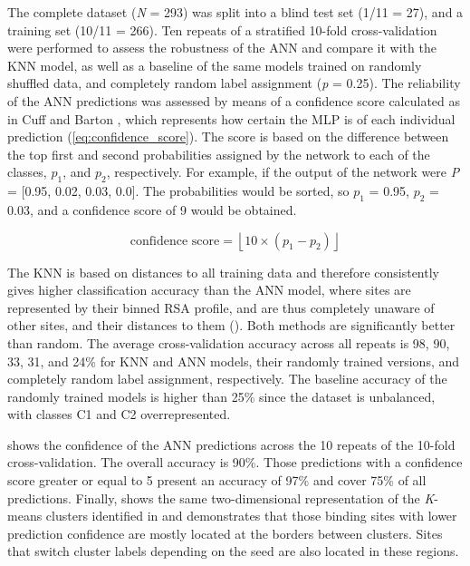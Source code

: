 {The complete dataset (\textit{N} = 293) was split into a blind test set (1/11 = 27), and a training set (10/11 = 266). Ten repeats of a stratified 10-fold cross-validation were performed to assess the robustness of the ANN and compare it with the KNN model, as well as a baseline of the same models trained on randomly shuffled data, and completely random label assignment (\textit{p} = 0.25). The reliability of the ANN predictions was assessed by means of a confidence score calculated as in Cuff and Barton \cite{CUFF_2000_PROFILES}, which represents how certain the MLP is of each individual prediction (\autoref{eq:confidence_score}). The score is based on the difference between the top first and second probabilities assigned by the network to each of the classes, $p_{1}$, and $p_{2}$, respectively. For example, if the output of the network were \textit{P} = [0.95, 0.02, 0.03, 0.0]. The probabilities would be sorted, so $p_{1}$ = 0.95, $p_{2}$ = 0.03, and a confidence score of 9 would be obtained.

\vspace{-12pt} %

\begin{equation}
\text{confidence score} = \left\lfloor 10 \times (p_1 - p_2) \right\rfloor
\label{eq:confidence_score}
\end{equation}

\vspace{-20pt} %

The KNN is based on distances to all training data and therefore consistently gives higher classification accuracy than the ANN model, where sites are represented by their binned RSA profile, and are thus completely unaware of other sites, and their distances to them (). Both methods are significantly better than random. The average cross-validation accuracy across all repeats is 98, 90, 33, 31, and 24\% for KNN and ANN models, their randomly trained versions, and completely random label assignment, respectively. The baseline accuracy of the randomly trained models is higher than 25\% since the dataset is unbalanced, with classes C1 and C2 overrepresented.

 shows the confidence of the ANN predictions across the 10 repeats of the 10-fold cross-validation. The overall accuracy is 90\%. Those predictions with a confidence score greater or equal to 5 present an accuracy of 97\% and cover 75\% of all predictions. Finally,  shows the same two-dimensional representation of the \textit{K}-means clusters identified in  and demonstrates that those binding sites with lower prediction confidence are mostly located at the borders between clusters. Sites that switch cluster labels depending on the seed are also located in these regions.

}
